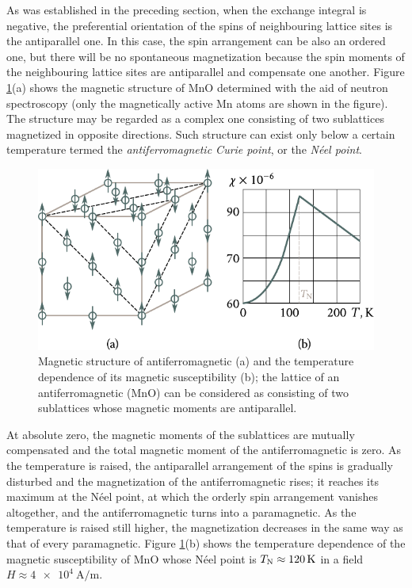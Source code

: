 As was established in the preceding section, when the exchange integral is negative, the preferential orientation of the spins of neighbouring lattice sites is the antiparallel one. In this case, the spin arrangement can be also an ordered one, but there will be no spontaneous magnetization because the spin moments of the neighbouring lattice sites are antiparallel and compensate one another. Figure \ref{fig:7_22}(a) shows the magnetic structure of MnO determined with the aid of neutron spectroscopy (only the magnetically active Mn atoms are shown in the figure). The structure may be regarded as a complex one consisting of two sublattices magnetized in opposite directions. Such structure can exist only below a certain temperature termed the \textit{antiferromagnetic Curie point}, or the \textit{N\'eel point}.

\begin{figure}[t]
	\begin{center}
		\includegraphics[scale=1]{figures/ch_07/fig_7_22.pdf}
		\caption[]{Magnetic structure of antiferromagnetic (a) and the temperature dependence of its magnetic susceptibility (b); the lattice of an antiferromagnetic (MnO) can be considered as consisting of two sublattices whose magnetic moments are antiparallel.}
		\label{fig:7_22}
	\end{center}
	\vspace{-0.8cm}
\end{figure}

At absolute zero, the magnetic moments of the sublattices are mutually compensated and the total magnetic moment of the antiferromagnetic is zero. As the temperature is raised, the antiparallel arrangement of the spins is gradually disturbed and the magnetization of the antiferromagnetic rises; it reaches its maximum at the N\'eel point, at which the orderly spin arrangement vanishes altogether, and the antiferromagnetic turns into a paramagnetic. As the temperature is raised still higher, the magnetization decreases in the same way as that of every paramagnetic. Figure \ref{fig:7_22}(b) shows the temperature dependence of the magnetic susceptibility of MnO whose N\'eel point is $T_{\text{N}}\approx\SI{120}{\kelvin}$ in a field $H\approx\SI{4e4}{\ampere\per\metre}$.

